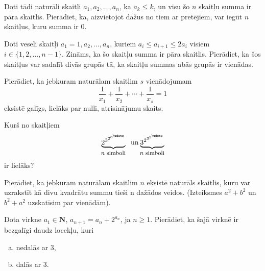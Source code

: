 \documentclass[a4paper,12pt]{article}
\begin{document}
\vspace{10pt}
\begin{problem}
Doti tādi naturāli skaitļi $a_1,a_2,\ldots,a_n$, ka $a_k \leq k$, un visu šo $n$ skaitļu summa ir pāra skaitlis. 
Pierādiet, ka, aizvietojot dažus no tiem ar pretējiem, var iegūt $n$ skaitļus, kuru summa ir $0$.
\end{problem}


\vspace{10pt}
\begin{problem}
Doti veseli skaitļi $a_1 = 1,a_2,\ldots,a_n$, kuriem $a_i \leq a_{i+1} \leq 2a_i$ visiem $i \in \{ 1,2,\ldots,n-1 \}$. 
Zināms, ka šo skaitļu summa ir pāra skaitlis. Pierādiet, ka šos skaitļus var sadalīt divās grupās tā, 
ka skaitļu summas abās grupās ir vienādas.
\end{problem}


\vspace{10pt}
\begin{problem}
Pierādiet, ka jebkuram naturālam skaitlim $s$ vienādojumam
\[ \frac{1}{x_1} + \frac{1}{x_2} + \cdots + \frac{1}{x_s} = 1 \]
eksistē galīgs, lielāks par nulli, atrisinājumu skaits.
\end{problem}


\vspace{10pt}
\begin{problem}
Kurš no skaitļiem 
\[ \underbrace{2^{3^{2^{3^{\udots}}}}}_{\mbox{\footnotesize $n$ simboli}} \;\;\text{un} \underbrace{3^{2^{3^{2^{\udots}}}}}_{\mbox{\footnotesize $n$ simboli}} \]
ir lielāks?
\end{problem}


\vspace{10pt}
\begin{problem}
Pierādiet, ka jebkuram naturālam skaitlim $n$ eksistē naturāls skaitlis, 
kuru var uzrakstīt kā divu kvadrātu summu tieši n dažādos veidos. 
(Izteiksmes $a^2 + b^2$ un $b^2 + a^2$ uzskatīsim par vienādām).
\end{problem}


\vspace{10pt}
\begin{problem}
Dota virkne $a_1 \in \mathbf{N}$, $a_{n+1} = a_n + 2^{a_n}$, ja $n \geq 1$. 
Pierādiet, ka šajā virknē ir bezgalīgi daudz locekļu, kuri
\begin{enumerate}[(a)]
\item nedalās ar $3$,
\item dalās ar $3$.
\end{enumerate}
\end{problem}
\end{document}
